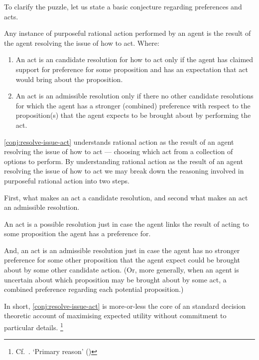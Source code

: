 \begin{note}
  To clarify the puzzle, let us state a basic conjecture regarding preferences and acts.

  \begin{conjecture}\label{conj:resolve-issue-act}
    Any instance of purposeful rational action performed by an agent is the result of the agent resolving the issue of how to act.
    Where:
    \begin{enumerate}
    \item An act is an candidate resolution for how to act only if the agent has claimed support for preference for some proposition and has an expectation that act would bring about the proposition.
    \item An act is an admissible resolution only if there no other candidate resolutions for which the agent has a stronger (combined) preference with respect to the proposition(s) that the agent expects to be brought about by performing the act.
    \end{enumerate}
  \end{conjecture}

  \autoref{conj:resolve-issue-act} understands rational action as the result of an agent resolving the issue of how to act --- choosing which act from a collection of options to perform.
  By understanding rational action as the result of an agent resolving the issue of how to act we may break down the reasoning involved in purposeful rational action into two steps.

  First, what makes an act a candidate resolution, and second what makes an act an admissible resolution.

  An act is a possible resolution just in case the agent links the result of acting to some proposition the agent has a preference for.

  And, an  act is an admissible resolution just in case the agent has no stronger preference for some other proposition that the agent expect could be brought about by some other candidate action.
  (Or, more generally, when an agent is uncertain about which proposition may be brought about by some act, a combined preference regarding each potential proposition.)

  In short, \autoref{conj:resolve-issue-act} is more-or-less the core of an standard decision theoretic account of maximising expected utility without commitment to particular details.\nolinebreak
  \footnote{
    \color{red}
    Cf.\ \textcite{Steele:2020tr}.
    \citeauthor{Davidson:1963aa} `Primary reason' (\Citeyear{Davidson:1963aa})
  }
\end{note}

